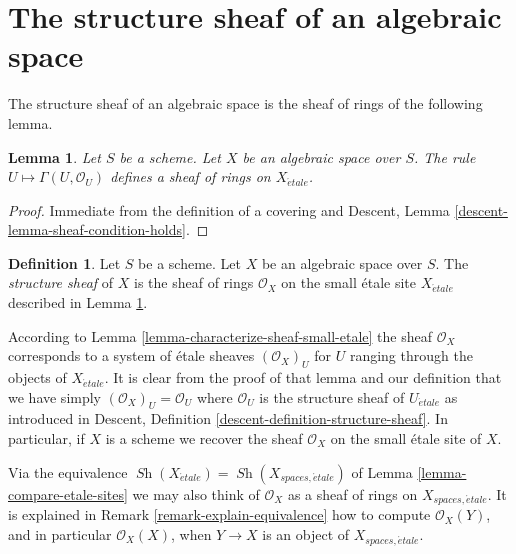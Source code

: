 \documentclass{stacks-project}
\theoremstyle{plain}
\newtheorem{lemma}[subsection]{Lemma}
\theoremstyle{definition}
\newtheorem{definition}[subsection]{Definition}
\theoremstyle{remark}
\numberwithin{equation}{subsection}
\def\Sh{\mathop{\mathit{Sh}}\nolimits}
\def\etale{{\acute{e}tale}}
\begin{document}
\section{The structure sheaf of an algebraic space}
\label{section-structure-sheaf}

\noindent
The structure sheaf of an algebraic space is the sheaf of rings of the
following lemma.

\begin{lemma}
\label{lemma-sheaf-condition-holds}
Let $S$ be a scheme. Let $X$ be an algebraic space over $S$.
The rule $U \mapsto \Gamma(U, \mathcal{O}_U)$ defines
a sheaf of rings on $X_\etale$.
\end{lemma}

\begin{proof}
Immediate from the definition of a covering and
Descent, Lemma \ref{descent-lemma-sheaf-condition-holds}.
\end{proof}

\begin{definition}
\label{definition-structure-sheaf}
Let $S$ be a scheme.
Let $X$ be an algebraic space over $S$.
The {\it structure sheaf} of $X$
is the sheaf of rings $\mathcal{O}_X$
on the small \'etale site $X_\etale$ described in
Lemma \ref{lemma-sheaf-condition-holds}.
\end{definition}

\noindent
According to Lemma \ref{lemma-characterize-sheaf-small-etale} the sheaf
$\mathcal{O}_X$ corresponds to a system of \'etale sheaves $(\mathcal{O}_X)_U$
for $U$ ranging through the objects of $X_\etale$. It is clear from
the proof of that lemma and our definition that we have simply
$(\mathcal{O}_X)_U = \mathcal{O}_U$ where $\mathcal{O}_U$ is the structure
sheaf of $U_\etale$ as introduced in
Descent, Definition \ref{descent-definition-structure-sheaf}.
In particular, if $X$ is a scheme we recover the sheaf $\mathcal{O}_X$
on the small \'etale site of $X$.

\medskip\noindent
Via the equivalence
$\Sh(X_\etale) = \Sh(X_{spaces, \etale})$
of Lemma \ref{lemma-compare-etale-sites} we may also think of $\mathcal{O}_X$
as a sheaf of rings on $X_{spaces, \etale}$. It is explained in
Remark \ref{remark-explain-equivalence}
how to compute $\mathcal{O}_X(Y)$, and in particular $\mathcal{O}_X(X)$, when
$Y \to X$ is an object of $X_{spaces, \etale}$.
\end{document}
